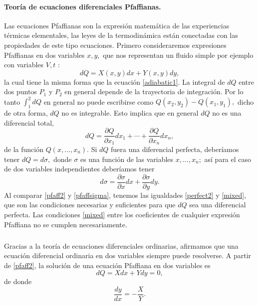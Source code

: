 \documentclass{article}
\theoremstyle{definition} \newtheorem{defi}{Definici\'on}
\theoremstyle{definition} \newtheorem{teo}{Teorema}
\theoremstyle{definition} \newtheorem{cor}{Corolario}
\begin{document}
\paragraph{Teor\'ia de ecuaciones diferenciales Pfaffianas.}
Las ecuaciones Pfaffianas son la expresi\'on matem\'atica de las experiencias t\'ermicas elementales, las leyes de la termodin\'amica est\'an conectadas con las propiedades de este tipo ecuaciones. Primero consideraremos expresiones Pfaffianas en dos variables $x, y,$ que nos representan un fluido simple por ejemplo con variables $V,t$ \cite{MB}:
\begin{equation}\label{pfaff2}
dQ = X(x,y) dx + Y(x,y) dy,
\end{equation}
la cual tiene la misma forma que la ecuaci\'on \eqref{adiabatic1}. La integral de $dQ$ entre dos puntos $P_1$ y $P_2$ en general depende de la trayectoria de integraci\'on. Por lo tanto $\int_1 ^2 dQ$ en general no puede escribirse como $Q(x_2, y_2)-Q(x_1, y_1),$ dicho de otra forma, $dQ$ no es integrable. Esto implica que en general $dQ$ no es una diferencial total,
\begin{equation}
dQ=\frac{\partial Q}{\partial x_1}dx_1+\cdots+\frac{\partial Q}{\partial x_n}dx_n,
\end{equation}
 de la funci\'on $Q(x, \dots,x_n).$ Si $dQ$ fuera una diferencial perfecta, deber\'iamos tener $dQ = d\sigma,$ donde $\sigma$ es una funci\'on de las variables $x,\dots,x_n;$ as\'i para el caso de dos variables independientes deber\'iamos tener
\begin{equation}\label{pfaffsigma}
d\sigma = \frac{\partial{\sigma}}{\partial{x}}dx + \frac{\partial{\sigma}}{\partial{y}}dy.
\end{equation}
Al comparar \eqref{pfaff2} y \eqref{pfaffsigma}, tenemos las igualdades \eqref{perfect2} y \eqref{mixed}, que son las condiciones necesarias y suficientes para que $dQ$ sea una diferencial perfecta. Las condiciones \eqref{mixed} entre los coeficientes de cualquier expresi\'on Pfaffiana no se cumplen necesariamente.
\subparagraph{}
Gracias a la teor\'ia de ecuaciones diferenciales ordinarias, afirmamos que una ecuaci\'on diferencial ordinaria en dos variables siempre puede resolverse. A partir de \eqref{pfaff2}, la soluci\'on de una ecuaci\'on Pfaffiana en dos variables es 
\begin{equation}\label{pfaffclean}
dQ = X dx + Y dy = 0,
\end{equation}
de donde
\begin{equation}\label{slope}
\frac{dy}{dx} = -\frac{X}{Y}.
\end{equation}
\end{document}
